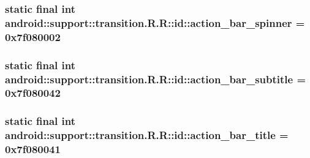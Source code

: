 \hypertarget{classandroid_1_1support_1_1transition_1_1_r_1_1id_71e46b00b606b1456c3363e051795d73}{
\subsubsection[{action\_\-bar\_\-spinner}]{\setlength{\rightskip}{0pt plus 5cm}static final int android::support::transition.R.R::id::action\_\-bar\_\-spinner = 0x7f080002}}
\label{classandroid_1_1support_1_1transition_1_1_r_1_1id_71e46b00b606b1456c3363e051795d73}


\hypertarget{classandroid_1_1support_1_1transition_1_1_r_1_1id_cc74fa1534825b97a679d492a96f83b5}{
\subsubsection[{action\_\-bar\_\-subtitle}]{\setlength{\rightskip}{0pt plus 5cm}static final int android::support::transition.R.R::id::action\_\-bar\_\-subtitle = 0x7f080042}}
\label{classandroid_1_1support_1_1transition_1_1_r_1_1id_cc74fa1534825b97a679d492a96f83b5}


\hypertarget{classandroid_1_1support_1_1transition_1_1_r_1_1id_67252b100132474b74e8e294e7d9f6ef}{
\subsubsection[{action\_\-bar\_\-title}]{\setlength{\rightskip}{0pt plus 5cm}static final int android::support::transition.R.R::id::action\_\-bar\_\-title = 0x7f080041}}
\label{classandroid_1_1support_1_1transition_1_1_r_1_1id_67252b100132474b74e8e294e7d9f6ef}


